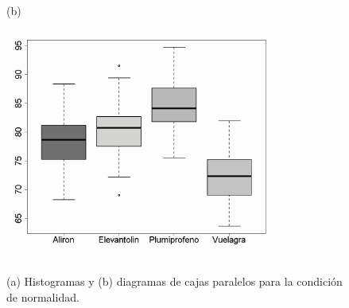 \begin{figure}[p]
\begin{center}
\begin{bn}
(b)\\
\includegraphics[width=9cm]{../fig/Cap11-BoxplotsParalelos-bn.png}\\
\end{bn}
\caption{(a) Histogramas y (b) diagramas de cajas paralelos para la condición de normalidad.}
\label{cap11:fig:BoxplotsParalelos}
\end{center}
\end{figure}

